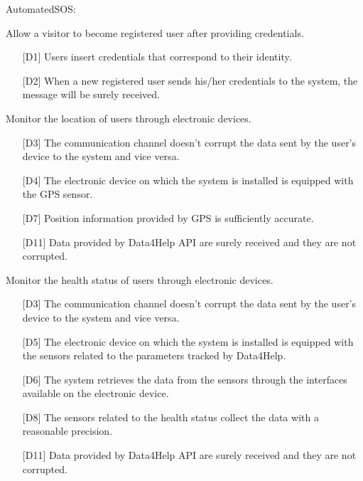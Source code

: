 \noindent
AutomatedSOS:
\begin{enumerate} [resume, label={[G\arabic*]}]
    \item Allow a visitor to become registered user after providing credentials.
        \begin{itemize}
            \item [{[D1]}] Users insert credentials that correspond to their identity.
            \item [{[D2]}] When a new registered user sends his/her credentials to the system, the message will be surely received.
        \end{itemize}
        
    \item Monitor the location of users through electronic devices.
        \begin{itemize}
            \item [{[D3]}] The communication channel doesn't corrupt the data sent by the user's device to the system and vice versa.
            \item [{[D4]}] The electronic device on which the system is installed is equipped with the GPS sensor.
            \item [{[D7]}] Position information provided by GPS is sufficiently accurate.
            \item [{[D11]}] Data  provided  by  Data4Help  API  are  surely  received  and  they  are  not corrupted.
        \end{itemize}
        
    \item Monitor the health status of users through electronic devices.
        \begin{itemize}
            \item [{[D3]}] The communication channel doesn't corrupt the data sent by the user's device to the system and vice versa.
            \item [{[D5]}] The electronic device on which the system is installed is equipped with the sensors related to the parameters tracked by Data4Help.
            \item [{[D6]}] The  system  retrieves  the  data  from  the  sensors  through  the  interfaces available on the electronic device.
            \item [{[D8]}] The sensors related to the health status collect the data with a reasonable precision.
            \item [{[D11]}] Data  provided  by  Data4Help  API  are  surely  received  and  they  are  not corrupted.
        \end{itemize}
        

\end{enumerate}
